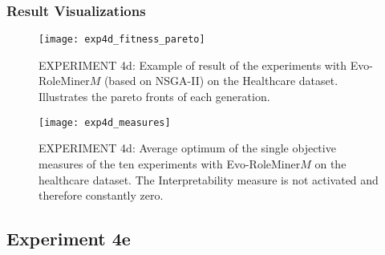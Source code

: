 		\subsubsection{Result Visualizations}
		\label{sec:A_Exp4d_Diagrams}
			\begin{figure}[H]
				\centering
				\texttt{[image: exp4d\_fitness\_pareto]}
				\caption{EXPERIMENT 4d: Example of result of the experiments with Evo-RoleMiner$M$ (based on NSGA-II) on the Healthcare dataset. Illustrates the pareto fronts of each generation.}
				\label{fig:exp4d_fitness_pareto}
			\end{figure}
			\begin{figure}[H]
				\centering
				\texttt{[image: exp4d\_measures]}
				\caption{EXPERIMENT 4d: Average optimum of the single objective measures of the ten experiments with Evo-RoleMiner$M$ on the healthcare dataset. The Interpretability measure is not activated and therefore constantly zero.}
				\label{fig:exp4d_measures}
			\end{figure}
			
	\subsection{Experiment 4e}
	\label{sec:A_Exp4e}
